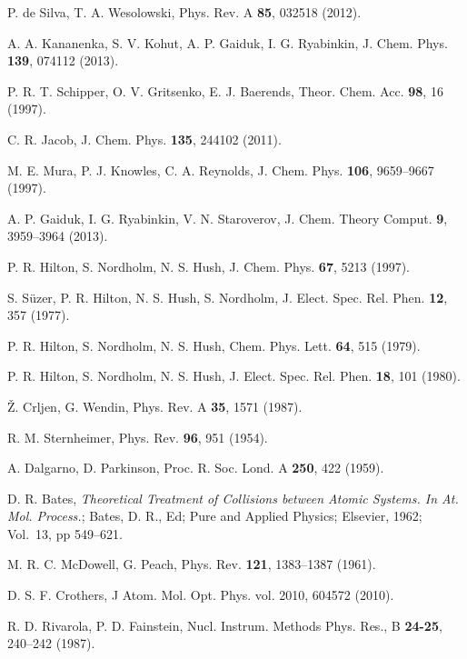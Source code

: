 \begin{thebibliography}{9}
P. de Silva, T. A. Wesolowski,
Phys. Rev. A \textbf{85}, 032518 (2012).

A. A. Kananenka, S. V. Kohut, A. P. Gaiduk, I. G. Ryabinkin, 
J. Chem. Phys. \textbf{139}, 074112 (2013).

P. R. T. Schipper, O. V. Gritsenko, E. J. Baerends,
Theor. Chem. Acc. \textbf{98}, 16 (1997).

C. R. Jacob,
J. Chem. Phys. \textbf{135}, 244102 (2011).

M. E. Mura, P. J. Knowles, C. A. Reynolds, 
J. Chem. Phys. \textbf{106}, 9659--9667 (1997).

A. P. Gaiduk, I. G. Ryabinkin, V. N. Staroverov, 
J. Chem. Theory Comput. \textbf{9}, 3959--3964 (2013).

P. R. Hilton, S. Nordholm, N. S. Hush, 
J. Chem. Phys. \textbf{67}, 5213 (1997).

S. S{\"u}zer, P. R. Hilton, N. S. Hush, S. Nordholm,
J. Elect. Spec. Rel. Phen. \textbf{12}, 357 (1977).

P. R. Hilton, S. Nordholm, N. S. Hush,
Chem. Phys. Lett. \textbf{64}, 515 (1979).

P. R. Hilton, S. Nordholm, N. S. Hush, 
J. Elect. Spec. Rel. Phen. \textbf{18}, 101 (1980).

{\v Z}. Crljen, G. Wendin,
Phys. Rev. A \textbf{35}, 1571 (1987).

R. M. Sternheimer, 
Phys. Rev. \textbf{96}, 951 (1954).

A. Dalgarno, D. Parkinson,
Proc. R. Soc. Lond. A \textbf{250}, 422 (1959).

D. R. Bates, 
\textit{Theoretical Treatment of Collisions between Atomic Systems.
In At. Mol. Process.};
Bates, D. R., Ed;
Pure and Applied Physics;
Elsevier, 1962;
Vol.~13, pp 549--621.

M. R. C. McDowell, G. Peach, 
Phys. Rev. \textbf{121}, 1383--1387 (1961).

D. S. F. Crothers,
J Atom. Mol. Opt. Phys. vol. 2010, 604572 (2010).

R. D. Rivarola, P. D. Fainstein,
Nucl. Instrum. Methods Phys. Res., B \textbf{24-25}, 240--242 (1987).


\end{thebibliography}
